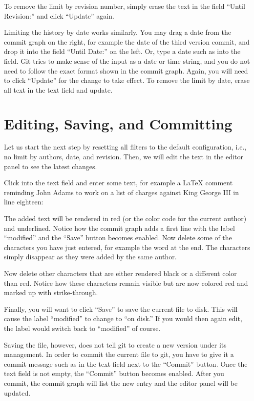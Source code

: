 To remove the limit by revision number, simply erase the text in the field ``Until Revision:'' and click ``Update'' again.

Limiting the history by date works similarly.  You may drag a date from the commit graph on the right, for example the date of the third version commit, and drop it into the field ``Until Date:'' on the left.  Or, type a date such as  into the field.  Git tries to make sense of the input as a date or time string, and you do not need to follow the exact format shown in the commit graph.  Again, you will need to click ``Update'' for the change to take effect.  To remove the limit by date, erase all text in the text field and update.

\section{Editing, Saving, and Committing}

Let us start the next step by resetting all filters to the default configuration, i.e., no limit by authors, date, and revision.  Then, we will edit the text in the editor panel to see the latest changes.

Click into the text field and enter some text, for example a LaTeX comment reminding John Adams to work on a list of charges against King George III in line eighteen:
\begin{CodeVerbatim}
\end{CodeVerbatim}
The added text will be rendered in red (or the color code for the current author) and underlined.  Notice how the commit graph adds a first line with the label ``modified'' and the ``Save'' button becomes enabled.  Now delete some of the characters you have just entered, for example the word  at the end.  The characters simply disappear as they were added by the same author.

Now delete other characters that are either rendered black or a different color than red.  Notice how these characters remain visible but are now colored red and marked up with strike-through.

Finally, you will want to click ``Save'' to save the current file to disk.  This will cause the label ``modified'' to change to ``on disk.''  If you would then again edit, the label would switch back to ``modified'' of course.

Saving the file, however, does not tell git to create a new version under its management.  In order to commit the current file to git, you have to give it a commit message such as  in the text field next to the ``Commit'' button.  Once the text field is not empty, the ``Commit'' button becomes enabled.  After you commit, the commit graph will list the new entry and the editor panel will be updated.  

